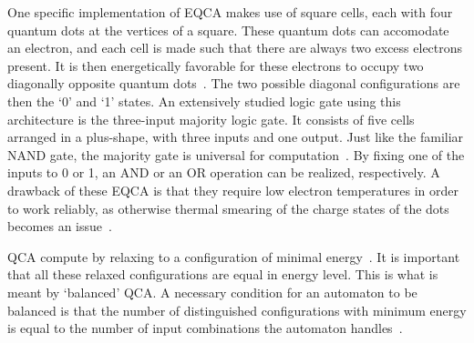 \documentclass[11pt,a4paper,english]{article}
\begin{document}
One specific implementation of EQCA makes use of square cells, each with four quantum dots at the vertices of a square. These quantum dots can accomodate an electron, and each cell is made such that there are always two excess electrons present. It is then energetically favorable for these electrons to occupy two diagonally opposite quantum dots~\cite{QCA_DigitalLogicGate}. The two possible diagonal configurations are then the `0' and `1' states. An extensively studied logic gate using this architecture is the three-input majority logic gate. It consists of five cells arranged in a plus-shape, with three inputs and one output. Just like the familiar NAND gate, the majority gate is universal for computation~\cite{NML_Carlton}. By fixing one of the inputs to 0 or 1, an AND or an OR operation can be realized, respectively. A drawback of these EQCA is that they require low electron temperatures in order to work reliably, as otherwise thermal smearing of the charge states of the dots becomes an issue~\cite{QCA_DigitalLogicGate}. \par
QCA compute by relaxing to a configuration of minimal energy~\cite{QCA_Algorithms}. It is important that all these relaxed configurations are equal in energy level. This is what is meant by `balanced' QCA. A necessary condition for an automaton to be balanced is that the number of distinguished configurations with minimum energy is equal to the number of input combinations the automaton handles~\cite{QCA_Algorithms}.
\end{document}
